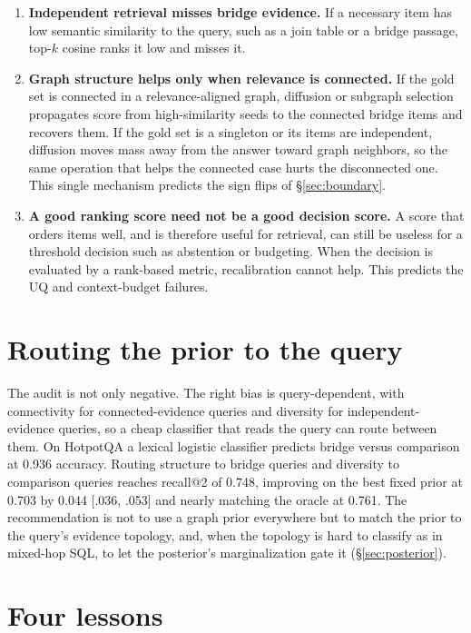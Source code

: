 \documentclass[11pt]{article}
\begin{document}
\begin{enumerate}[leftmargin=1.6em,itemsep=2pt]
\item \textbf{Independent retrieval misses bridge evidence.} If a necessary item has low semantic
similarity to the query, such as a join table or a bridge passage, top-$k$ cosine ranks it low and
misses it.
\item \textbf{Graph structure helps only when relevance is connected.} If the gold set is connected in
a relevance-aligned graph, diffusion or subgraph selection propagates score from high-similarity seeds
to the connected bridge items and recovers them. If the gold set is a singleton or its items are
independent, diffusion moves mass away from the answer toward graph neighbors, so the same operation
that helps the connected case hurts the disconnected one. This single mechanism predicts the sign flips
of \S\ref{sec:boundary}.
\item \textbf{A good ranking score need not be a good decision score.} A score that orders items well,
and is therefore useful for retrieval, can still be useless for a threshold decision such as abstention
or budgeting. When the decision is evaluated by a rank-based metric, recalibration cannot help. This
predicts the UQ and context-budget failures.
\end{enumerate}

\section{Routing the prior to the query}\label{sec:constructive}

The audit is not only negative. The right bias is query-dependent, with connectivity for
connected-evidence queries and diversity for independent-evidence queries, so a cheap classifier that
reads the query can route between them. On HotpotQA a lexical logistic classifier predicts bridge
versus comparison at 0.936 accuracy. Routing structure to bridge queries and diversity to comparison
queries reaches recall@2 of 0.748, improving on the best fixed prior at 0.703 by 0.044 [.036, .053] and
nearly matching the oracle at 0.761. The recommendation is not to use a graph prior everywhere but to
match the prior to the query's evidence topology, and, when the topology is hard to classify as in
mixed-hop SQL, to let the posterior's marginalization gate it (\S\ref{sec:posterior}).

\section{Four lessons}\label{sec:lessons}
\end{document}
